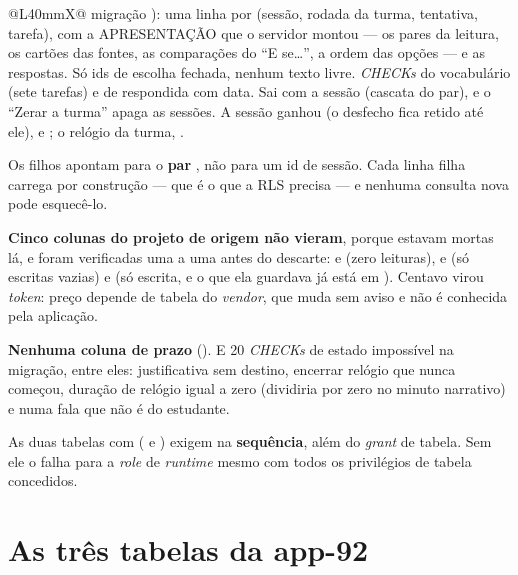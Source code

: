 \begin{tabularx}{\linewidth}{@{}L{40mm}X@{}}
  migração ): uma linha
  por (sessão, rodada da turma, tentativa, tarefa), com a APRESENTAÇÃO que o
  servidor montou --- os pares da leitura, os cartões das fontes, as
  comparações do \enquote{E se\ldots}, a ordem das opções --- e as respostas.
  Só ids de escolha fechada, nenhum texto livre. \emph{CHECKs} do vocabulário
  (sete tarefas) e de respondida com data. Sai com a sessão (cascata do par),
  e o \enquote{Zerar a turma} apaga as sessões. A sessão ganhou
   (o desfecho fica retido até ele),
   e ; o relógio da
  turma, .\\
\bottomrule
\end{tabularx}

\begin{regra}
Os filhos apontam para o \textbf{par} , não para um
id de sessão. Cada linha filha carrega  por construção --- que é o
que a RLS precisa --- e nenhuma consulta nova pode esquecê-lo.
\end{regra}

\textbf{Cinco colunas do projeto de origem não vieram}, porque estavam mortas
lá, e foram verificadas uma a uma antes do descarte:  e
 (zero leituras),  e 
(só escritas vazias) e  (só escrita, e o que ela guardava já está
em ). Centavo virou \emph{token}: preço depende de tabela do
\emph{vendor}, que muda sem aviso e não é conhecida pela aplicação.

\textbf{Nenhuma coluna de prazo} (). E 20 \emph{CHECKs} de estado
impossível na migração, entre eles: justificativa sem destino, encerrar relógio
que nunca começou, duração de relógio igual a zero (dividiria por zero no minuto
narrativo) e  numa fala que não é do estudante.

\begin{atencao}
As duas tabelas com  ( e
) exigem  na \textbf{sequência}, além do
\emph{grant} de tabela. Sem ele o  falha para a \emph{role} de
\emph{runtime} mesmo com todos os privilégios de tabela concedidos.
\end{atencao}

\section{As três tabelas da app-92}
\label{sec:tabelas-app92}

